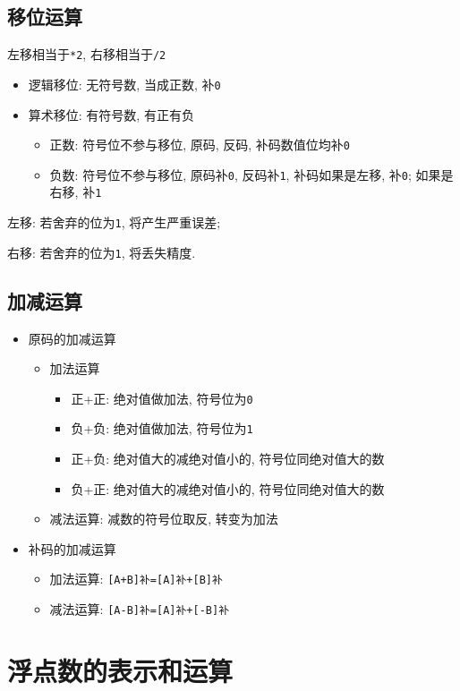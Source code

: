 \subsection{移位运算} %
左移相当于\verb|*2|, 右移相当于\verb|/2|
\begin{itemize}
\item 逻辑移位: 无符号数, 当成正数, 补\verb|0|
\item 算术移位: 有符号数, 有正有负
\begin{itemize}
\item 正数: 符号位不参与移位, 原码, 反码, 补码数值位均补\verb|0|
\item 负数: 符号位不参与移位, 原码补\verb|0|, 反码补\verb|1|, 补码如果是左移, 补\verb|0|; 如果是右移, 补\verb|1|
\end{itemize}
\end{itemize} \par
左移: 若舍弃的位为\verb|1|, 将产生严重误差; \par 右移: 若舍弃的位为\verb|1|, 将丢失精度.
\subsection{加减运算}
\begin{itemize}
\item 原码的加减运算
\begin{itemize}
\item 加法运算
\begin{itemize}
\item 正+正: 绝对值做加法, 符号位为\verb|0|
\item 负+负: 绝对值做加法, 符号位为\verb|1|
\item 正+负: 绝对值大的减绝对值小的, 符号位同绝对值大的数
\item 负+正: 绝对值大的减绝对值小的, 符号位同绝对值大的数
\end{itemize}
\item 减法运算: 减数的符号位取反, 转变为加法
\end{itemize}
\item 补码的加减运算
\begin{itemize}
\item 加法运算: \verb|[A+B]补=[A]补+[B]补|
\item 减法运算: \verb|[A-B]补=[A]补+[-B]补|
\end{itemize}
\end{itemize}
\section{浮点数的表示和运算}
